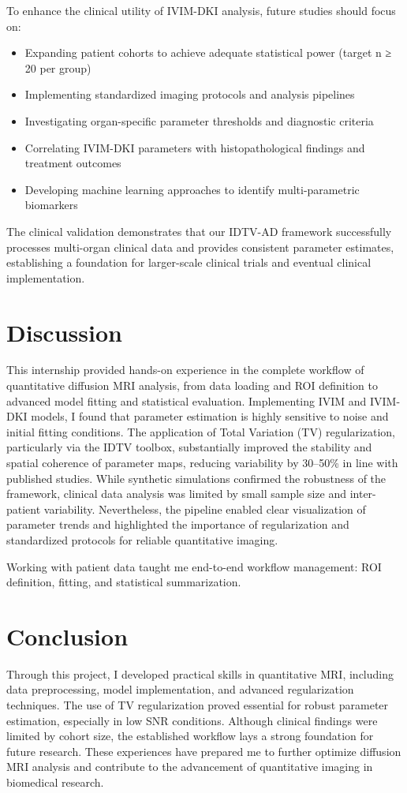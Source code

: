 \documentclass[a4paper,12pt]{article}
\begin{document}
To enhance the clinical utility of IVIM-DKI analysis, future studies should focus on:

\begin{itemize}
    \item Expanding patient cohorts to achieve adequate statistical power (target n ≥ 20 per group)
    \item Implementing standardized imaging protocols and analysis pipelines
    \item Investigating organ-specific parameter thresholds and diagnostic criteria
    \item Correlating IVIM-DKI parameters with histopathological findings and treatment outcomes
    \item Developing machine learning approaches to identify multi-parametric biomarkers
\end{itemize}

The clinical validation demonstrates that our IDTV-AD framework successfully processes multi-organ clinical data and provides consistent parameter estimates, establishing a foundation for larger-scale clinical trials and eventual clinical implementation.


\section{Discussion}
This internship provided hands-on experience in the complete workflow of quantitative diffusion MRI analysis, from data loading and ROI definition to advanced model fitting and statistical evaluation. Implementing IVIM and IVIM-DKI models, I found that parameter estimation is highly sensitive to noise and initial fitting conditions. The application of Total Variation (TV) regularization, particularly via the IDTV toolbox, substantially improved the stability and spatial coherence of parameter maps, reducing variability by 30--50\% in line with published studies. While synthetic simulations confirmed the robustness of the framework, clinical data analysis was limited by small sample size and inter-patient variability. Nevertheless, the pipeline enabled clear visualization of parameter trends and highlighted the importance of regularization and standardized protocols for reliable quantitative imaging.


Working with patient data taught me end-to-end workflow management: ROI definition, fitting, and statistical summarization.

\section{Conclusion}
Through this project, I developed practical skills in quantitative MRI, including data preprocessing, model implementation, and advanced regularization techniques. The use of TV regularization proved essential for robust parameter estimation, especially in low SNR conditions. Although clinical findings were limited by cohort size, the established workflow lays a strong foundation for future research. These experiences have prepared me to further optimize diffusion MRI analysis and contribute to the advancement of quantitative imaging in biomedical research.
\end{document}
